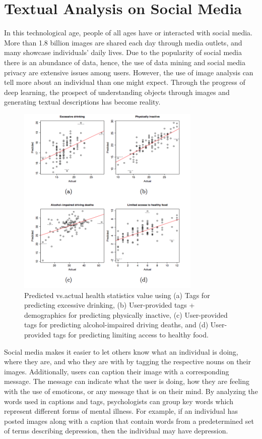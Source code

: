 \documentclass[11pt,technote,twocolumn]{IEEEtran}
\begin{document}
\section{Textual Analysis on Social Media}
In this technological age, people of all ages have or interacted with social media. More than 1.8 billion images are shared each day through media outlets, and many showcase individuals' daily lives. Due to the popularity of social media there is an abundance of data, hence, the use of data mining and social media privacy are extensive issues among users. However, the use of image analysis can tell more about an individual than one might expect. Through the progress of deep learning, the prospect of understanding objects through images and generating textual descriptions has become reality.
\par
\begin{figure}[t]
    \centering
    \includegraphics[width=330px]{Graph}
    \caption{Predicted vs.\hspace{1mm}actual health statistics value using (a) Tags for predicting excessive drinking, (b) User-provided tags + demographics for predicting physically inactive, (c) User-provided tags for predicting alcohol-impaired driving deaths, and (d) User-provided tags for predicting limiting access to healthy food. }
\end{figure}
Social media makes it easier to let others know what an individual is doing, where they are, and who they are with by tagging the respective nouns on their images. Additionally, users can caption their image with a corresponding message. The message can indicate what the user is doing, how they are feeling with the use of emoticons, or any message that is on their mind. By analyzing the words used in captions and tags, psychologists can group key words which represent different forms of mental illness. For example, if an individual has posted images along with a caption that contain words from a predetermined set of terms describing depression, then the individual may have depression.
\end{document}
